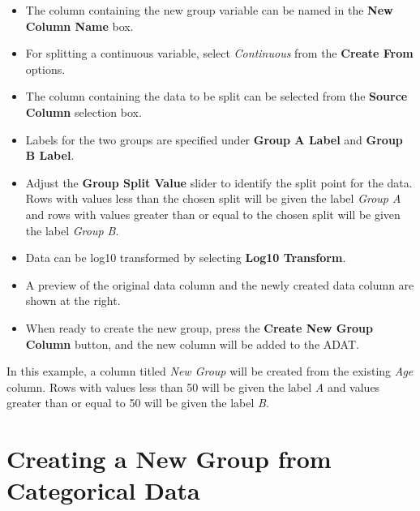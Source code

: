 \documentclass[
]{book}
\providecommand{\tightlist}{%
  \setlength{\itemsep}{0pt}\setlength{\parskip}{0pt}}
\begin{document}
\begin{itemize}
\tightlist
\item
  The column containing the new group variable can be named in the \textbf{New Column Name} box.\\
\item
  For splitting a continuous variable, select \emph{Continuous} from the \textbf{Create From} options.\\
\item
  The column containing the data to be split can be selected from the \textbf{Source Column} selection box.
\item
  Labels for the two groups are specified under \textbf{Group A Label} and \textbf{Group B Label}.
\item
  Adjust the \textbf{Group Split Value} slider to identify the split point for the data. Rows with values less than the chosen split will be given the label \emph{Group A} and rows with values greater than or equal to the chosen split will be given the label \emph{Group B}.
\item
  Data can be log10 transformed by selecting \textbf{Log10 Transform}.
\item
  A preview of the original data column and the newly created data column are shown at the right.
\item
  When ready to create the new group, press the \textbf{Create New Group Column} button, and the new column will be added to the ADAT.
\end{itemize}

In this example, a column titled \emph{New Group} will be created from the existing \emph{Age} column. Rows with values less than 50 will be given the label \emph{A} and values greater than or equal to 50 will be given the label \emph{B}.

\hypertarget{creating-a-new-group-from-categorical-data}{%
\section{Creating a New Group from Categorical Data}\label{creating-a-new-group-from-categorical-data}}
\end{document}
